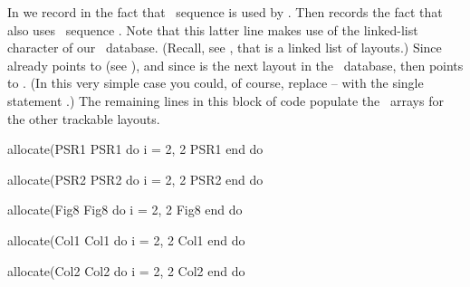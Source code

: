 In  we record in  the fact that \DNA\ sequence  is used by . Then  records the fact that  also uses \DNA\ sequence . Note that this latter line makes use of the linked-list character of our \DNA\ database. (Recall, see , that  is a linked list of layouts.) Since  already points to  (see ), and since  is the next layout in the \DNA\ database, then  points to . (In this very simple case you could, of course, replace -- with the single statement .) The remaining lines in this block of code populate the \DNA\ arrays for the other trackable layouts.
%
\begin{ptccode}
allocate(PSR1%
PSR1%
do i = 2, 2                                   \label{lin:dna.bdo}
  PSR1%
end do                                        \label{lin:dna.edo}

allocate(PSR2%
PSR2%
do i = 2, 2
  PSR2%
end do

allocate(Fig8%
Fig8%
do i = 2, 2
  Fig8%
end do

allocate(Col1%
Col1%
do i = 2, 2
  Col1%
end do

allocate(Col2%
Col2%
do i = 2, 2
  Col2%
end do
\end{ptccode}

